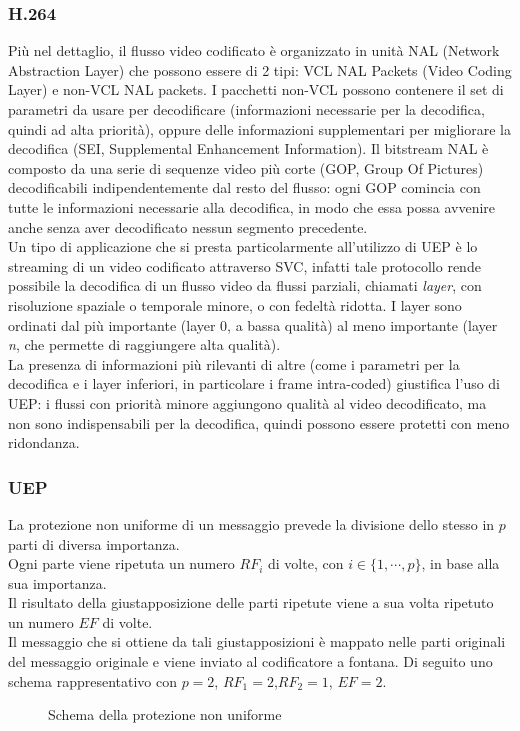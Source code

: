 \documentclass[italian, a4paper, 12pt]{article}
\begin{document}
\subsubsection{H.264}
Più nel dettaglio, il flusso video codificato è organizzato in unità NAL (Network Abstraction Layer) che possono essere di 2 tipi: VCL NAL Packets (Video Coding Layer) e non-VCL NAL packets. I pacchetti non-VCL possono contenere il set di parametri da usare per decodificare (informazioni necessarie per la decodifica, quindi ad alta priorità), oppure delle informazioni supplementari per migliorare la decodifica (SEI, Supplemental Enhancement Information). Il bitstream NAL è composto da una serie di sequenze video più corte (GOP, Group Of Pictures) decodificabili indipendentemente dal resto del flusso: ogni GOP comincia con tutte le informazioni necessarie alla decodifica, in modo che essa possa avvenire anche senza aver decodificato nessun segmento precedente.\\
Un tipo di applicazione che si presta particolarmente all'utilizzo di UEP \cite{uep} è lo streaming di un video codificato attraverso SVC, infatti tale protocollo rende possibile la decodifica di un flusso video da flussi parziali, chiamati \textit{layer}, con risoluzione spaziale o temporale minore, o con fedeltà ridotta. I layer sono ordinati dal più importante (layer 0, a bassa qualità) al meno importante (layer \textit{n}, che permette di raggiungere alta qualità).\\
La presenza di informazioni più rilevanti di altre (come i parametri per la decodifica e i layer inferiori, in particolare i frame intra-coded) giustifica l'uso di UEP: i flussi con priorità minore aggiungono qualità al video decodificato, ma non sono indispensabili per la decodifica, quindi possono essere protetti con meno ridondanza.
\subsubsection{UEP}\label{UEPsection}
La protezione non uniforme di un messaggio prevede la divisione dello stesso in $p$ parti di diversa importanza.\\
Ogni parte viene ripetuta un numero $RF_i$ di volte, con $i\in\{1,\cdots,p\}$, in base alla sua importanza.\\
Il risultato della giustapposizione delle parti ripetute viene a sua volta ripetuto un numero $EF$ di volte.\\
Il messaggio che si ottiene da tali giustapposizioni è mappato nelle parti originali del messaggio originale e viene inviato al codificatore a fontana. Di seguito uno schema rappresentativo con $p=2$, $RF_1 = 2$,$RF_2=1$, $EF=2$.
\begin{figure}[H]
    \centering
    \caption{Schema della protezione non uniforme}
    \label{fig:UEP}
\end{figure}
\newpage
\end{document}
